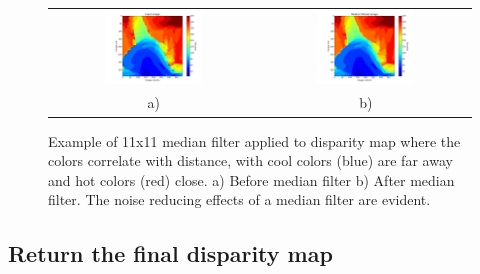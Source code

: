 \documentclass[11pt,fleqn]{article}
\begin{document}
\begin{figure}[!h]
\begin{mdframed}
\centering
\begin{tabular}{cc}
\includegraphics[width=0.49\textwidth, trim=60 10 25 10, clip]{images/median1.png} &
\includegraphics[width=0.49\textwidth, trim=60 10 25 10, clip]{images/median2.png}\\[2pt]
a) & b) \\
\end{tabular}
\caption[Example of 11x11 median filter applied to disparity map]{Example of 11x11 median filter applied to disparity map where the colors correlate with distance, with cool colors (blue) are far away and hot colors (red) close. a) Before median filter b) After median filter. 
The noise reducing effects of a median filter are evident.}
\label{fig:medians}
\end{mdframed}
\end{figure}


\subsection{Return the final disparity map}
\end{document}
